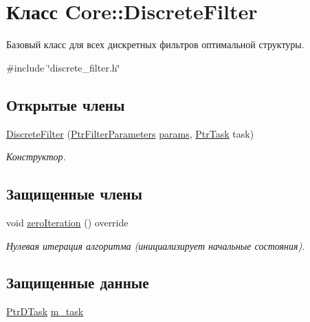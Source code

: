 \hypertarget{class_core_1_1_discrete_filter}{}\section{Класс Core\+:\+:Discrete\+Filter}
\label{class_core_1_1_discrete_filter}


Базовый класс для всех дискретных фильтров оптимальной структуры.  




{\ttfamily \#include \char`\"{}discrete\+\_\+filter.\+h\char`\"{}}

\subsection*{Открытые члены}
\begin{DoxyCompactItemize}
\item 
\hypertarget{class_core_1_1_discrete_filter_a87399ba405c2dfe8037191fe907df141}{}\label{class_core_1_1_discrete_filter_a87399ba405c2dfe8037191fe907df141} 
\hyperlink{class_core_1_1_discrete_filter_a87399ba405c2dfe8037191fe907df141}{Discrete\+Filter} (\hyperlink{namespace_core_a4811af8148ba137d644b9a61a042cf03}{Ptr\+Filter\+Parameters} \hyperlink{class_core_1_1_filter_a44aa749b49ba46256975ce545531ecf7}{params}, \hyperlink{namespace_core_abfda8f69fcacfcea2696549b548ed737}{Ptr\+Task} task)
\begin{DoxyCompactList}\small\item\em Конструктор. \end{DoxyCompactList}\end{DoxyCompactItemize}
\subsection*{Защищенные члены}
\begin{DoxyCompactItemize}
\item 
void \hyperlink{class_core_1_1_discrete_filter_a658617c64c7067bb6b98b5e9d78f982e}{zero\+Iteration} () override
\begin{DoxyCompactList}\small\item\em Нулевая итерация алгоритма (инициализирует начальные состояния). \end{DoxyCompactList}\end{DoxyCompactItemize}
\subsection*{Защищенные данные}
\begin{DoxyCompactItemize}
\item 
\hyperlink{namespace_core_a9cd3f9b81303651b8d115031018f0ebf}{Ptr\+D\+Task} \hyperlink{class_core_1_1_discrete_filter_a6a2d67be8eaa0df383fe080474975faa}{m\+\_\+task}
\end{DoxyCompactItemize}


